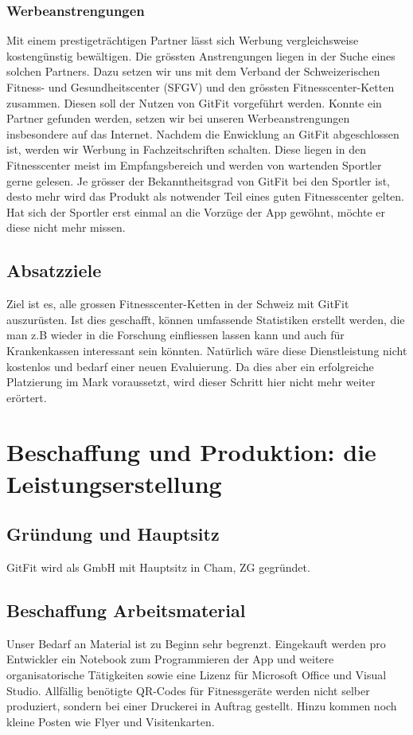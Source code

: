 \subsubsection{Werbeanstrengungen}
Mit einem prestigeträchtigen Partner lässt sich Werbung vergleichsweise kostengünstig bewältigen. Die grössten Anstrengungen liegen in der Suche eines solchen Partners. Dazu setzen wir uns mit dem Verband der Schweizerischen Fitness- und Gesundheitscenter (SFGV) und den grössten Fitnesscenter-Ketten zusammen. Diesen soll der Nutzen von GitFit vorgeführt werden. Konnte ein Partner gefunden werden, setzen wir bei unseren Werbeanstrengungen insbesondere auf das Internet. Nachdem die Enwicklung an GitFit abgeschlossen ist, werden wir Werbung in Fachzeitschriften schalten. Diese liegen in den Fitnesscenter meist im Empfangsbereich und werden von wartenden Sportler gerne gelesen. Je grösser der Bekanntheitsgrad von GitFit bei den Sportler ist, desto mehr wird das Produkt als notwender Teil eines guten Fitnesscenter gelten. Hat sich der Sportler erst einmal an die Vorzüge der App gewöhnt, möchte er diese nicht mehr missen.

\subsection{Absatzziele}
Ziel ist es, alle grossen Fitnesscenter-Ketten in der Schweiz mit GitFit auszurüsten. Ist dies geschafft, können umfassende Statistiken erstellt werden, die man z.B wieder in die Forschung einfliessen lassen kann und auch für Krankenkassen interessant sein könnten. Natürlich wäre diese Dienstleistung nicht kostenlos und bedarf einer neuen Evaluierung. Da dies aber ein erfolgreiche Platzierung im Mark voraussetzt, wird dieser Schritt hier nicht mehr weiter erörtert.

\clearpage
\section{Beschaffung und Produktion: die Leistungserstellung}
\subsection{Gründung und Hauptsitz}
GitFit wird als GmbH mit Hauptsitz in Cham, ZG gegründet.
\subsection{Beschaffung Arbeitsmaterial}
Unser Bedarf an Material ist zu Beginn sehr begrenzt. Eingekauft werden pro Entwickler ein Notebook zum Programmieren der App und weitere organisatorische Tätigkeiten sowie eine Lizenz für Microsoft Office und Visual Studio. Allfällig benötigte QR-Codes für Fitnessgeräte werden nicht selber produziert, sondern bei einer Druckerei in Auftrag gestellt. Hinzu kommen noch kleine Posten wie Flyer und Visitenkarten.
